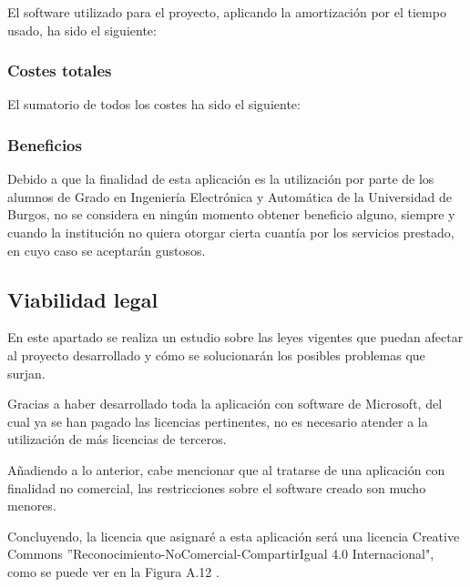 El software utilizado para el proyecto, aplicando la amortización por el tiempo usado, ha sido el siguiente:


\subsubsection{Costes totales}

El sumatorio de todos los costes ha sido el siguiente:


\subsubsection{Beneficios}

Debido a que la finalidad de esta aplicación es la utilización por parte de los alumnos de Grado en Ingeniería Electrónica y Automática de la Universidad de Burgos, no se considera en ningún momento obtener beneficio alguno, siempre y cuando la institución no quiera otorgar cierta cuantía por los servicios prestado, en cuyo caso se aceptarán gustosos.

\subsection{Viabilidad legal}

En este apartado se realiza un estudio sobre las leyes vigentes que puedan afectar al proyecto desarrollado y cómo se solucionarán los posibles problemas que surjan.

Gracias a haber desarrollado toda la aplicación con software de Microsoft, del cual ya se han pagado las licencias pertinentes, no es necesario atender a la utilización de más licencias de terceros.

Añadiendo a lo anterior, cabe mencionar que al tratarse de una aplicación con finalidad no comercial, las restricciones sobre el software creado son mucho menores.

Concluyendo, la licencia que asignaré a esta aplicación será una licencia Creative Commons ''Reconocimiento-NoComercial-CompartirIgual 4.0 Internacional", como se puede ver en la Figura A.12 \cite{web:cc}.


